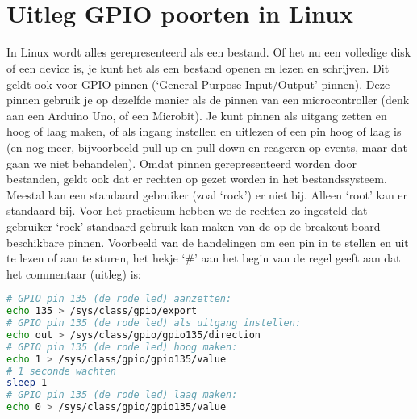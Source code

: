 ~\\~\\~\\~\\~\\~\\~\\~\\~\\~\\~\\~\\~\\~\\~\\~\\~\\~\\~\\~\\~\\~\\~\\~\\

\break
\section{Uitleg GPIO poorten in Linux}\label{app:gpiolinux}
In Linux wordt alles gerepresenteerd als een bestand. Of het nu een volledige disk of een device is, je kunt het als een bestand openen en lezen en schrijven. Dit geldt ook voor GPIO pinnen (‘General Purpose Input/Output’ pinnen). Deze pinnen gebruik je op dezelfde manier als de pinnen van een microcontroller (denk aan een Arduino Uno, of een Microbit). Je kunt pinnen als uitgang zetten en hoog of laag maken, of als ingang instellen en uitlezen of een pin hoog of laag is (en nog meer, bijvoorbeeld pull-up en pull-down en reageren op events, maar dat gaan we niet behandelen).\newline
Omdat pinnen gerepresenteerd worden door bestanden, geldt ook dat er rechten op gezet worden in het bestandssysteem. Meestal kan een standaard gebruiker (zoal ‘rock’) er niet bij. Alleen ‘root’ kan er standaard bij. Voor het practicum hebben we de rechten zo ingesteld dat gebruiker ‘rock’ standaard gebruik kan maken van de op de breakout board beschikbare pinnen.\newline
Voorbeeld van de handelingen om een pin in te stellen en uit te lezen of aan te sturen, het hekje ‘\#’ aan het begin van de regel geeft aan dat het commentaar (uitleg) is:

\begin{lstlisting}[language=bash]
# GPIO pin 135 (de rode led) aanzetten:
echo 135 > /sys/class/gpio/export
# GPIO pin 135 (de rode led) als uitgang instellen:
echo out > /sys/class/gpio/gpio135/direction
# GPIO pin 135 (de rode led) hoog maken:
echo 1 > /sys/class/gpio/gpio135/value
# 1 seconde wachten
sleep 1
# GPIO pin 135 (de rode led) laag maken:
echo 0 > /sys/class/gpio/gpio135/value
\end{lstlisting}
	
